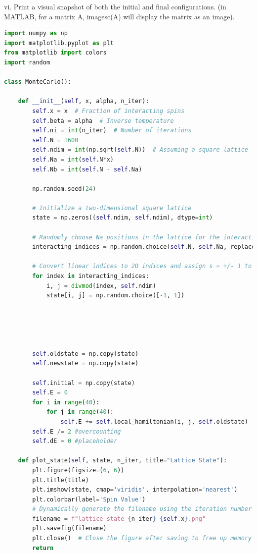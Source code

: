 \documentclass[12pt]{article}
\begin{document}
vi. Print a visual snapshot of both the initial and final configurations. (in MATLAB, for a matrix $\mathrm{A}$, imagesc(A) will display the matrix as an image).\\
\begin{lstlisting}[language=Python]
import numpy as np
import matplotlib.pyplot as plt
from matplotlib import colors
import random

class MonteCarlo():

    def __init__(self, x, alpha, n_iter):
        self.x = x  # Fraction of interacting spins
        self.beta = alpha  # Inverse temperature
        self.ni = int(n_iter)  # Number of iterations
        self.N = 1600
        self.ndim = int(np.sqrt(self.N))  # Assuming a square lattice
        self.Na = int(self.N*x)
        self.Nb = int(self.N - self.Na)

        np.random.seed(24)

        # Initialize a two-dimensional square lattice
        state = np.zeros((self.ndim, self.ndim), dtype=int)

        # Randomly choose Na positions in the lattice for the interacting spins
        interacting_indices = np.random.choice(self.N, self.Na, replace=False)

        # Convert linear indices to 2D indices and assign s = +/- 1 to these positions
        for index in interacting_indices:
            i, j = divmod(index, self.ndim)
            state[i, j] = np.random.choice([-1, 1])
 


        
   
        self.oldstate = np.copy(state)
        self.newstate = np.copy(state)

        self.initial = np.copy(state)
        self.E = 0
        for i in range(40):
            for j in range(40):
                self.E += self.local_hamiltonian(i, j, self.oldstate)
        self.E /= 2 #overcounting
        self.dE = 0 #placeholder

    def plot_state(self, state, n_iter, title="Lattice State"):
        plt.figure(figsize=(6, 6))
        plt.title(title)
        plt.imshow(state, cmap='viridis', interpolation='nearest')
        plt.colorbar(label='Spin Value')
        # Dynamically generate the filename using the iteration number
        filename = f"lattice_state_{n_iter}_{self.x}.png"
        plt.savefig(filename)
        plt.close()  # Close the figure after saving to free up memory
        return
        



\end{lstlisting}
\end{document}
